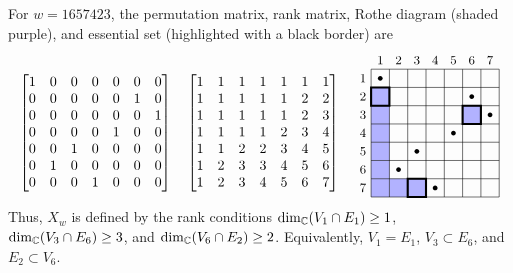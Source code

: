 \begin{example}\label{ex:Essential}
For $w = 1657423$, the permutation matrix, rank matrix, Rothe diagram (shaded purple), and essential set (highlighted with a black border) are
\[
\begin{bmatrix}
    1 & 0 & 0 & 0 & 0 & 0 & 0\\
    0 & 0 & 0 & 0 & 0 & 1 & 0\\
    0 & 0 & 0 & 0 & 0 & 0 & 1\\
    0 & 0 & 0 & 0 & 1 & 0 & 0\\
    0 & 0 & 1 & 0 & 0 & 0 & 0\\
    0 & 1 & 0 & 0 & 0 & 0 & 0\\
    0 & 0 & 0 & 1 & 0 & 0 & 0\\
\end{bmatrix}\quad
\begin{bmatrix}
    1 & 1 & 1 & 1 & 1 & 1 & 1\\
    1 & 1 & 1 & 1 & 1 & 2 & 2\\
    1 & 1 & 1 & 1 & 1 & 2 & 3\\
    1 & 1 & 1 & 1 & 2 & 3 & 4\\
    1 & 1 & 2 & 2 & 3 & 4 & 5\\
    1 & 2 & 3 & 3 & 4 & 5 & 6\\
    1 & 2 & 3 & 4 & 5 & 6 & 7\\
\end{bmatrix}\quad
\begin{tikzpicture}[scale=0.46,baseline={([yshift=-2.9mm]current bounding box.center)}]
\foreach \c/\r in {
    1/2,
    1/3, 6/3,
    1/4,
    1/5,
    1/6,
    1/7, 2/7, 3/7
}{
    \fill[blue!30] (\c-1,7-\r) rectangle (\c,8-\r);
}
\draw[step=1,black,thin] (0,0) grid (7,7);
\foreach \c/\r in {
    1/1,
    2/6,
    3/5,
    4/7,
    5/4,
    6/2,
    7/3
}{
    \fill[black] (\c-0.5,7.5-\r) circle (0.13);
}
\foreach \i in {1,...,7}{
    \node[above] at (\i-0.5,7) {\small \i};
}
\foreach \i in {1,...,7}{
    \node[left] at (0,7.5-\i) {\small \i};
}
\foreach \c/\r in {1/2, 3/7, 6/3} {\draw[black, line width=1.5pt] (\c-1,7-\r) rectangle (\c,8-\r);}
\end{tikzpicture}
\]
Thus, $X_w$ is defined by the rank conditions $\dim_{\mathbb{C}}(V_1\cap E_1)\geq 1$, $\dim_{\mathbb{C}}(V_3\cap E_6)\geq 3$, and $\dim_{\mathbb{C}}(V_6\cap E_2)\geq 2$. Equivalently, $V_1 = E_1$, $V_3 \subset E_6$, and $E_2\subset V_6$.
\end{example}

